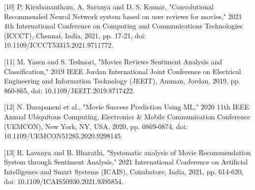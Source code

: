 \documentclass[acmlarge,nonacm,12pt]{acmart}
\begin{document}
[10] P. Kirubanantham, A. Saranya and D. S. Kumar, "Convolutional Recommended Neural Network system based on user reviews for movies," 2021 4th International Conference on Computing and Communications Technologies (ICCCT), Chennai, India, 2021, pp. 17-21, doi: 10.1109/ICCCT53315.2021.9711772.

[11] M. Yasen and S. Tedmori, "Movies Reviews Sentiment Analysis and Classification," 2019 IEEE Jordan International Joint Conference on Electrical Engineering and Information Technology (JEEIT), Amman, Jordan, 2019, pp. 860-865, doi: 10.1109/JEEIT.2019.8717422.

[12] N. Darapaneni et al., "Movie Success Prediction Using ML," 2020 11th IEEE Annual Ubiquitous Computing, Electronics \& Mobile Communication Conference (UEMCON), New York, NY, USA, 2020, pp. 0869-0874, doi: 10.1109/UEMCON51285.2020.9298145.

[13] R. Lavanya and B. Bharathi, "Systematic analysis of Movie Recommendation System through Sentiment Analysis," 2021 International Conference on Artificial Intelligence and Smart Systems (ICAIS), Coimbatore, India, 2021, pp. 614-620, doi: 10.1109/ICAIS50930.2021.9395854.
\end{document}
